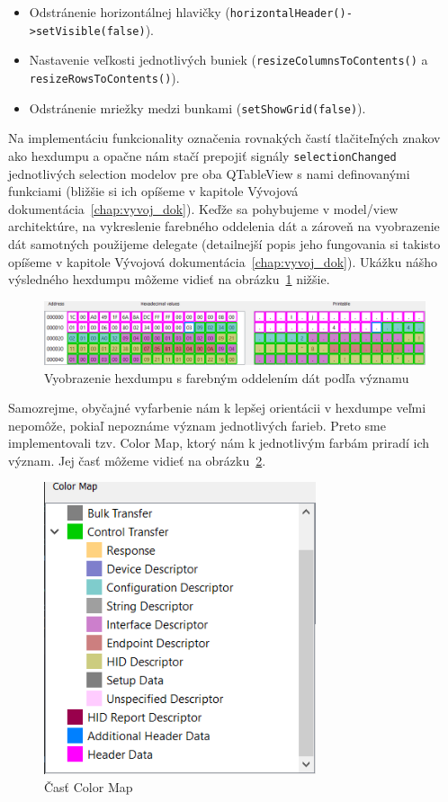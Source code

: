 \begin{itemize}
\item Odstránenie horizontálnej hlavičky \newline(\texttt{horizontalHeader()->setVisible(false)}).
\item Nastavenie veľkosti jednotlivých buniek (\texttt{resizeColumnsToContents()} a \texttt{resizeRowsToContents()}).
\item Odstránenie mriežky medzi bunkami (\texttt{setShowGrid(false)}).
\end{itemize}

Na implementáciu funkcionality označenia rovnakých častí tlačiteľných znakov ako hexdumpu a opačne nám stačí prepojiť signály \texttt{selectionChanged} jednotlivých selection modelov pre oba QTableView s nami definovanými funkciami (bližšie si ich opíšeme v kapitole Vývojová dokumentácia~\ref{chap:vyvoj_dok}). Keďže sa pohybujeme v model/view architektúre, na vykreslenie farebného oddelenia dát a zároveň na vyobrazenie dát samotných použijeme delegate (detailnejší popis jeho fungovania si takisto opíšeme v kapitole Vývojová dokumentácia~\ref{chap:vyvoj_dok}). Ukážku nášho výsledného hexdumpu môžeme vidieť na obrázku~\ref{obr:kap3:hexdump_color} nižšie.

\begin{figure}[!htb]
	\centering
	\includegraphics[width=\textwidth]{img/kap03_hexdump_color}
	\caption{Vyobrazenie hexdumpu s farebným oddelením dát podľa významu}
	\label{obr:kap3:hexdump_color}
\end{figure}

Samozrejme, obyčajné vyfarbenie nám k lepšej orientácii v hexdumpe veľmi nepomôže, pokiaľ nepoznáme význam jednotlivých farieb. Preto sme implementovali tzv. Color Map, ktorý nám k jednotlivým farbám priradí ich význam. Jej časť môžeme vidieť na obrázku~\ref{obr:kap3:color_map}.

\begin{figure}[!htb]
	\centering
	\includegraphics[width=8cm]{img/kap03_colormap}
	\caption{Časť Color Map}
	\label{obr:kap3:color_map}
\end{figure}

